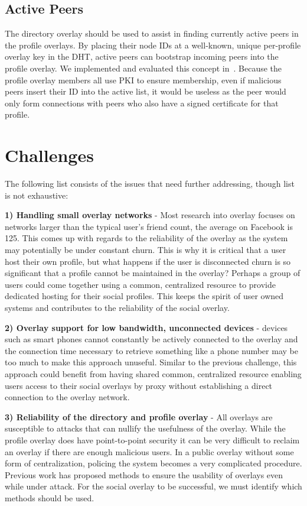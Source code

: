 \documentclass[letterpaper,twocolumn,10pt]{article}
\begin{document}
\subsection{Active Peers}
The directory overlay should be used to assist in finding currently active peers
in the profile overlays.  By placing their node IDs at a well-known, unique
per-profile overlay key in the DHT, active peers can bootstrap incoming peers
into the profile overlay.  We implemented and evaluated this concept
in~\cite{icdcs10}.  Because the profile overlay members all use PKI to ensure
membership, even if malicious peers insert their ID into the active list, it would be useless as the peer
would only form connections with peers who also have a signed certificate for
that profile.

\section{Challenges}
\label{outstanding}
The following list consists of the issues that need further addressing, though
list is not exhaustive:

{\bf 1) Handling small overlay networks} - Most research into overlay focuses on
networks larger than the typical user's friend count, the average on Facebook
is 125.  This comes up with regards to the reliability of the overlay as the
system may potentially be under constant churn.  This is why it is critical
that a user host their own profile, but what happens if the user is disconnected
churn is so significant that a profile cannot be maintained in the overlay?
Perhaps a group of users could come together using a common, centralized resource
to provide dedicated hosting for their social profiles.  This keeps the spirit
of user owned systems and contributes to the reliability of the social overlay.

{\bf 2) Overlay support for low bandwidth, unconnected devices} - devices such as
smart phones cannot constantly be actively connected to the overlay and the
connection time necessary to retrieve something like a phone number may be
too much to make this approach unuseful.  Similar to the previous challenge,
this approach could benefit from having shared common, centralized resource
enabling users access to their social overlays by proxy without establishing a
direct connection to the overlay network.

{\bf 3) Reliability of the directory and profile overlay} - All overlays are
susceptible to attacks that can nullify the usefulness of the overlay.  While
the profile overlay does have point-to-point security it can be very difficult
to reclaim an overlay if there are enough malicious users.  In a public overlay
without some form of centralization, policing the system becomes a very
complicated procedure.  Previous work has proposed methods to ensure the usability
of overlays even while under attack.  For the social overlay to be successful,
we must identify which methods should be used.
\end{document}
